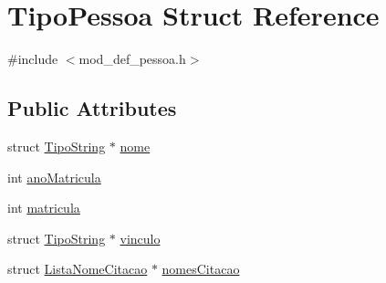 \hypertarget{structTipoPessoa}{\section{Tipo\+Pessoa Struct Reference}
\label{structTipoPessoa}
}


{\ttfamily \#include $<$mod\+\_\+def\+\_\+pessoa.\+h$>$}

\subsection*{Public Attributes}
\begin{DoxyCompactItemize}
\item 
struct \hyperlink{structTipoString}{Tipo\+String} $\ast$ \hyperlink{structTipoPessoa_ab0c566ddb672088f25083d90bdbc5022}{nome}
\item 
int \hyperlink{structTipoPessoa_ab1ef18dcae1d89d53cfa9ec087b7a15e}{ano\+Matricula}
\item 
int \hyperlink{structTipoPessoa_abd0ab3d3c3ff7d2fffaf8f162c27df37}{matricula}
\item 
struct \hyperlink{structTipoString}{Tipo\+String} $\ast$ \hyperlink{structTipoPessoa_a8e3a3d339c06a3408c1febf1d4063a4f}{vinculo}
\item 
struct \hyperlink{structListaNomeCitacao}{Lista\+Nome\+Citacao} $\ast$ \hyperlink{structTipoPessoa_abff4815bccf2680fd20e980a2c83120c}{nomes\+Citacao}
\end{DoxyCompactItemize}


